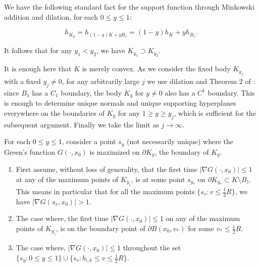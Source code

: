 \documentclass{article}
\theoremstyle{plain}
\theoremstyle{definition}
\theoremstyle{plain}
\begin{document}

We have the following standard fact for the support function through Minkowski addition and dilation, for each $0 \le y \le 1$:

\begin{equation}\label{1}
h_{K_y} = h_{(1-y)K + y B_1} = (1-y) h_K + y h_{B_1}.
\end{equation}

It follows that for any $y_1<y_2$, we have $K_{y_1}\supset K_{y_2}$.

It is enough here that $K$ is merely convex. As we consider the fixed body $K_{y_j}$ with a fixed $y_j \neq 0$, for any arbitrarily large $j$ we use dilation and Theorem 2 of \cite{KrPa91}: since $B_1$ has a $C_1$ boundary, the body $K_y$ for $y\neq 0$ also has a $C^1$ boundary. This is enough to determine unique normals and unique supporting hyperplanes everywhere on the boundaries of $K_y$ for any $1\geq y\geq y_j$, which is sufficient for the subsequent argument. Finally we take the limit as $j\to \infty$.

For each $0 \le y \le 1$, consider a point $s_y$ (not necessarily unique) where the Green's function $G(\cdot, x_0)$ is maximized on $\partial K_y$, the boundary of $K_y$. 

\begin{enumerate}
\item First assume, without loss of generality, that the first time $|\nabla G(\cdot, x_0)|\leq 1$ at any of the maximum points of $K_{y_j}$, is at some point $s_{y_*}$ on $\partial K_{y_*}\subset K\setminus B_1$. This means in particular that for all the maximum points $\{ s_v : v \le \tfrac{1}{2}R \}$, we have $|\nabla G(s_v, x_0)| > 1$.

\item The case where, the first time $|\nabla G(\cdot, x_0)| \le 1$ on any of the maximum points of $K_{y_{j}}$,
is on the boundary point of $\partial B(x_0, v_*)$ for some $v_* \le \tfrac{1}{2}R$.


\item The case where, $|\nabla G(\cdot, x_0)| \le 1$ throughout the set $\{ s_y : 0 \le y \le 1 \} \cup \{ s_v : b_{i,k}\le v \le \tfrac{1}{2}R \}$.

\end{enumerate}
\end{document}
